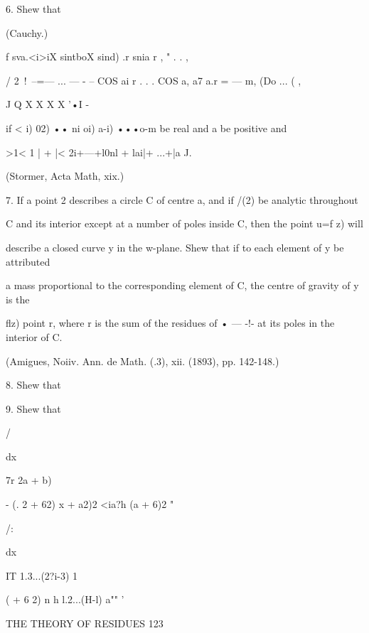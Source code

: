 6. Shew that



(Cauchy.)



f sva.<i>iX sintboX sind) .r snia r , " . . ,

/ 2\ !\ --=— ... — - -- COS ai r . . . COS a, a7 a.r = — m, (Do ... (
,

J Q X X X X '•I -

if < i) 02) •• ni oi) a-i) •••o-m be real and a be positive and

 >1< 1 | + |< 2i+---+l0nl + lai|+ ...+|a J.

(Stormer, Acta Math, xix.)

7. If a point 2 describes a circle C of centre a, and if /(2) be
analytic throughout

C and its interior except at a number of poles inside C, then the
point u=f z) will

describe a closed curve y in the w-plane. Shew that if to each element
of y be attributed

a mass proportional to the corresponding element of C, the centre of
gravity of y is the

flz) point r, where r is the sum of the residues of • — -!- at its
poles in the interior of C.



(Amigues, Noiiv. Ann. de Math. (.3), xii. (1893), pp. 142-148.)



8. Shew that



9. Shew that



/



dx



7r 2a + b)



- (. 2 + 62) x + a2)2 <ia?h (a + 6)2 "



/:



dx



IT 1.3...(2?i-3) 1



( + 6 2) n h l.2...(H-l) a"" '



THE THEORY OF RESIDUES 123




